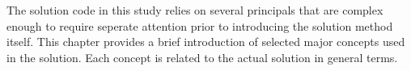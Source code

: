 The solution code in this study relies on several principals that are complex enough to require seperate attention prior to introducing the solution method itself. This chapter provides a brief introduction of selected major concepts used in the solution. Each concept is related to the actual solution in general terms.  
